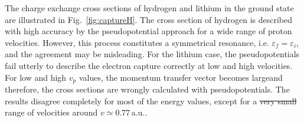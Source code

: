 \documentclass[10pt]{article}
\providecommand{\DIFaddtex}[1]{{\protect\color{blue}\uwave{#1}}} %
\providecommand{\DIFdeltex}[1]{{\protect\color{red}\sout{#1}}}                      %
\providecommand{\DIFaddbegin}{} %
\providecommand{\DIFaddend}{} %
\providecommand{\DIFdelbegin}{} %
\providecommand{\DIFdelend}{} %
\providecommand{\DIFadd}[1]{\texorpdfstring{\DIFaddtex{#1}}{#1}} %
\providecommand{\DIFdel}[1]{\texorpdfstring{\DIFdeltex{#1}}{}} %
\begin{document}
The charge exchange cross sections of hydrogen and lithium in the 
ground state are illustrated in Fig.~\ref{fig:captureH}. The cross 
section of hydrogen is described with high accuracy by the 
pseudopotential approach for a wide range of proton velocities. 
However, this process constitutes 
a symmetrical resonance, i.e. $\varepsilon_{\!f}=\varepsilon_{\!i}$, 
and the agreement may be misleading. For the lithium case, the 
pseudopotentials fail utterly to describe the electron capture 
correctly at low and high velocities. For low and high $v_p$ values, the 
momentum transfer vector becomes large\DIFaddbegin \DIFadd{, }\DIFaddend and therefore, the cross 
sections are wrongly calculated with pseudopotentials. 
The results disagree completely for most of the energy values, except
for a \DIFdelbegin \DIFdel{very small }\DIFdelend \DIFaddbegin \DIFadd{minimal }\DIFaddend range of velocities around $v\simeq0.77$\,a.u..
\end{document}
